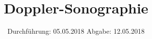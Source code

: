 

\subject{US-2}
\title{Doppler-Sonographie}
\date{%
  Durchführung: 05.05.2018
  \hspace{3em}
  Abgabe: 12.05.2018
}



\maketitle
\thispagestyle{empty}
\tableofcontents
\newpage






\printbibliography{}


